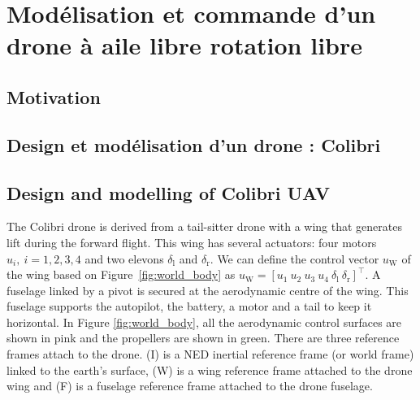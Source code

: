 
\chapter{Modélisation et commande d'un drone à aile libre rotation libre}
\minitoc
\label{chap:colibri}

\section{Motivation}
\label{sec:motivationcolibri}

\section{Design et modélisation d'un drone : Colibri}


\section{Design and modelling of Colibri UAV}
\label{sec:model_colibri}
The Colibri drone is derived from a tail-sitter drone with a wing that generates lift during the forward flight. This wing has several actuators: four motors $u_{i}, ~i = 1,2,3,4$ and two elevons $\delta_{\text{l}}$ and $\delta_{\text{r}}$. We can define the control vector $u_{\text{W}}$ of the wing based on Figure~\ref{fig:world_body} as $u_{\text{W}} = [u_{1}~u_{2}~u_{3}~u_{4}~\delta_{\text{l}}~\delta_{\text{r}}]^\top$. A fuselage linked by a pivot is secured at the aerodynamic centre of the wing. This fuselage supports the autopilot, the battery, a motor and a tail to keep it horizontal. In Figure \ref{fig:world_body}, all the aerodynamic control surfaces are shown in pink and the propellers are shown in green.
There are three reference frames attach to the drone. (I) is a NED inertial reference frame (or world frame) linked to the earth's surface, (W) is a wing reference frame attached to the drone wing and (F) is a fuselage reference frame attached to the drone fuselage.



